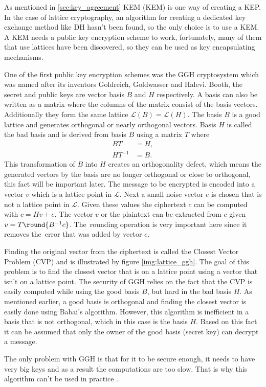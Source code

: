 As mentioned in \ref{sec:key_agreement} KEM (\acl{KEM}) is one way of creating a KEP. In the case of lattice cryptography, an algorithm for creating a dedicated key exchange method like DH hasn't been found, so the only choice is to use a KEM. A KEM needs a public key encryption scheme to work, fortunately, many of them that use lattices have been discovered, so they can be used as key encapsulating mechanisms.

One of the first public key encryption schemes was the GGH cryptosystem which was named after its inventors Goldreich, Goldwasser and Halevi. Booth, the secret and public keys are vector basis $B$ and $H$ respectively. A basis can also be written as a matrix where the columns of the matrix consist of the basis vectors. Additionally they form the same lattice $\mathcal{L}(B)=\mathcal{L}(H)$. The basis $B$ is a good lattice and generates orthogonal or nearly orthogonal vectors. Basis $H$ is called the bad basis and is derived from basis $B$ using a matrix $T$ where
\begin{equation}
  \begin{aligned}
    BT&=H, \\
    HT^{-1}&=B.
  \end{aligned}
\end{equation}
This transformation of $B$ into $H$ creates an orthogonality defect, which means the generated vectors by the basis are no longer orthogonal or close to orthogonal, this fact will be important later. The message to be encrypted is encoded into a vector $v$ which is a lattice point in $\mathcal{L}$. Next a small noise vector $e$ is chosen that is not a lattice point in $\mathcal{L}$. Given these values the ciphertext $c$ can be computed with $c = Hv + e$. The vector $v$ or the plaintext can be extracted from $c$ given $v=T \round{B^{-1}c}$. The~rounding operation is very important here since it removes the~error that was added by vector $e$. \cite{Bernstein2009}\cite{Goldreich1997}


Finding the original vector from the ciphertext is called the Closest Vector Problem (CVP) and is illustrated by figure \ref{img:lattice_ggh}. The goal of this problem is to find the closest vector that is on a lattice point using a vector that isn't on a lattice point. The security of GGH relies on the fact that the CVP is easily computed while using the good basis $B$, but hard in the bad basis $H$. As mentioned earlier, a good basis is orthogonal and finding the closest vector is easily done using Babai's algorithm. However, this algorithm is inefficient in a basis that is not orthogonal, which in this case is the basis $H$. Based on this fact it can be assumed that only the owner of the good basis (secret key) can decrypt a message. \cite{Goldreich1997}

The only problem with GGH is that for it to be secure enough, it needs to have very big keys and as a result the computations are too slow. That is why this algorithm can't be used in practice \cite{Bernstein2009}.
